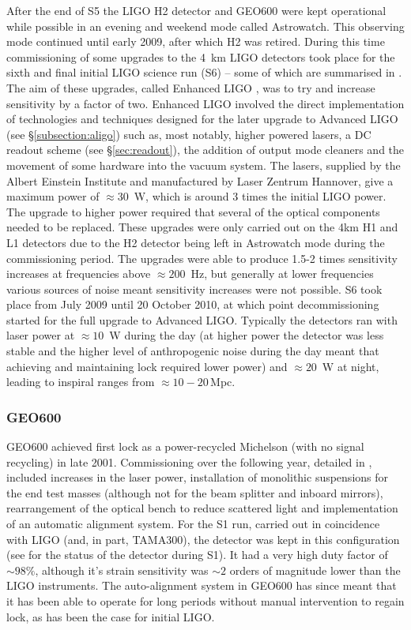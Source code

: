 \documentclass{article}
\begin{document}
After the end of S5 the LIGO H2 detector and GEO600 were kept operational while
possible in an evening and weekend mode called Astrowatch. This observing mode
continued until early 2009, after which H2 was retired. During this time
commissioning of some upgrades to the 4~km LIGO detectors took place for the
sixth and final initial LIGO science run (S6) -- some of which are summarised in
\cite{Whitcomb:2008}. The aim of these upgrades, called Enhanced LIGO
\cite{EnhancedLIGO}, was to try and  increase sensitivity by a factor of two.
Enhanced LIGO involved the direct implementation of technologies and techniques
designed for the later upgrade to Advanced LIGO (see \S\ref{subsection:aligo})
such as, most notably, higher powered lasers, a DC readout scheme (see
\S\ref{sec:readout}), the addition of output mode cleaners and the movement of
some hardware into the vacuum system. The lasers, supplied by the Albert
Einstein Institute and manufactured by Laser Zentrum Hannover, give a maximum
power of $\approx30$~W, which is around 3 times the initial LIGO power. The
upgrade to higher power required that several of the optical components needed
to be replaced. These upgrades were only carried out on the 4km H1 and L1
detectors due to the H2 detector being left in Astrowatch mode during the
commissioning period. The upgrades were able to produce 1.5-2 times sensitivity
increases at frequencies above $\approx 200$~Hz, but generally at lower
frequencies various sources of noise meant sensitivity increases were not
possible. S6 took place from July 2009 until 20 October 2010, at which point
decommissioning started for the full upgrade to Advanced LIGO. Typically the
detectors ran with laser power at $\approx10$~W during the day (at higher power
the detector was less stable and the higher level of anthropogenic noise during
the day meant that achieving and maintaining lock required lower power) and
$\approx 20$~W at night, leading to inspiral ranges from $\approx 10-20$\,Mpc.

\subsubsection{GEO600}
GEO600 achieved first lock as a power-recycled Michelson (with no signal
recycling) in late 2001. Commissioning over the following year, detailed in
\cite{Hewitson:2003}, included increases in the laser power, installation of
monolithic suspensions for the end test masses (although not for the beam
splitter and inboard mirrors), rearrangement of the optical bench to reduce
scattered light and implementation of an automatic alignment system. For the S1
run, carried out in coincidence with LIGO (and, in part, TAMA300), the detector
was kept in this configuration (see \cite{Abbott:2004a} for the status of the
detector during S1). It had a very high duty factor of $\sim98\%$, although
it's strain sensitivity was $\sim2$ orders of magnitude lower than the LIGO
instruments. The auto-alignment system in GEO600 has since meant that it has
been able to operate for long periods without manual intervention to regain
lock, as has been the case for initial LIGO.
\end{document}
